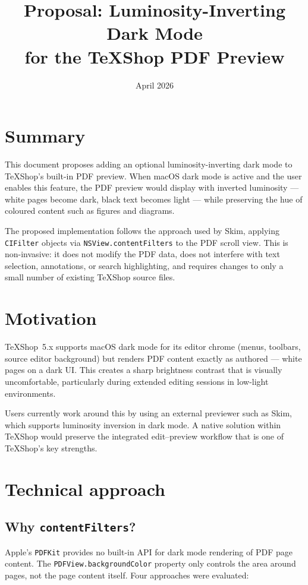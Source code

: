 \documentclass[11pt,a4paper]{article}
\title{\textbf{Proposal: Luminosity-Inverting Dark Mode\\for the TeXShop PDF Preview}}
\author{}
\date{April 2026}
\begin{document}
\maketitle

\section{Summary}

This document proposes adding an optional luminosity-inverting dark mode to
TeXShop's built-in PDF preview. When macOS dark mode is active and the user
enables this feature, the PDF preview would display with inverted luminosity ---
white pages become dark, black text becomes light --- while preserving the hue
of coloured content such as figures and diagrams.

The proposed implementation follows the approach used by Skim, applying
\texttt{CIFilter} objects via \texttt{NSView.contentFilters} to the PDF scroll
view. This is non-invasive: it does not modify the PDF data, does not interfere
with text selection, annotations, or search highlighting, and requires changes
to only a small number of existing TeXShop source files.

\section{Motivation}

TeXShop~5.x supports macOS dark mode for its editor chrome (menus, toolbars,
source editor background) but renders PDF content exactly as authored --- white
pages on a dark UI. This creates a sharp brightness contrast that is visually
uncomfortable, particularly during extended editing sessions in low-light
environments.

Users currently work around this by using an external previewer such as Skim,
which supports luminosity inversion in dark mode. A native solution within
TeXShop would preserve the integrated edit--preview workflow that is one of
TeXShop's key strengths.

\section{Technical approach}

\subsection{Why \texttt{contentFilters}?}

Apple's \texttt{PDFKit} provides no built-in API for dark mode rendering of PDF
page content. The \texttt{PDFView.backgroundColor} property only controls the
area around pages, not the page content itself. Four approaches were evaluated:
\end{document}
